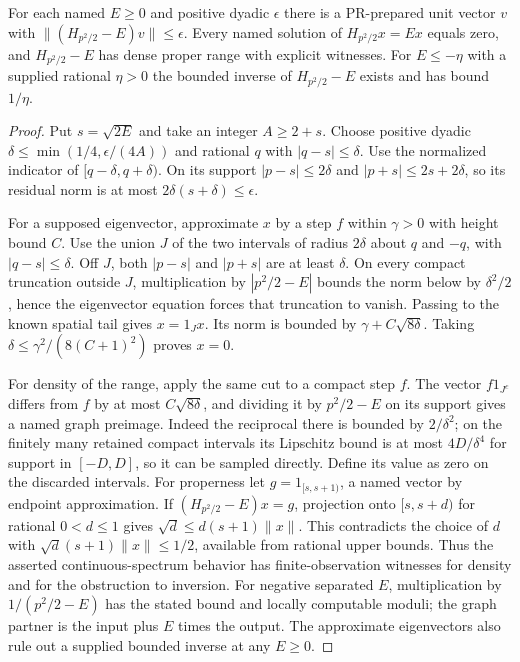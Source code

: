 \begin{proposition}
For each named $E\ge0$ and positive dyadic $\epsilon$ there is a
PR-prepared unit vector $v$ with $\|(H_{p^2/2}-E)v\|\le\epsilon$.
Every named solution of $H_{p^2/2}x=Ex$ equals zero, and
$H_{p^2/2}-E$ has dense proper range with explicit witnesses.
For $E\le-\eta$ with a supplied rational $\eta>0$ the bounded inverse
of $H_{p^2/2}-E$ exists and has bound $1/\eta$.
\end{proposition}
\begin{proof}
Put $s=\sqrt{2E}$ and take an integer $A\ge 2+s$.
Choose positive dyadic $\delta\le\min(1/4,\epsilon/(4A))$ and rational
$q$ with $|q-s|\le\delta$. Use the normalized indicator of
$[q-\delta,q+\delta)$. On its support $|p-s|\le2\delta$ and
$|p+s|\le2s+2\delta$, so its residual norm is at most
$2\delta(s+\delta)\le\epsilon$.

For a supposed eigenvector, approximate $x$ by a step $f$ within
$\gamma>0$ with height bound $C$. Use the union $J$ of the two intervals
of radius $2\delta$ about $q$ and $-q$, with $|q-s|\le\delta$.
Off $J$, both $|p-s|$ and $|p+s|$ are at least $\delta$.
On every compact truncation outside $J$, multiplication by
$|p^2/2-E|$ bounds the norm below by $\delta^2/2$, hence
the eigenvector equation forces that truncation to vanish. Passing
to the known spatial tail gives $x=1_Jx$. Its norm is bounded
by $\gamma+C\sqrt{8\delta}$. Taking
$\delta\le\gamma^2/(8(C+1)^2)$ proves $x=0$.

For density of the range, apply the same cut to a compact step $f$.
The vector $f1_{J^c}$ differs from $f$ by at most $C\sqrt{8\delta}$,
and dividing it by $p^2/2-E$ on its support gives a named graph
preimage. Indeed the reciprocal there is bounded by $2/\delta^2$;
on the finitely many retained compact intervals its Lipschitz bound
is at most $4D/\delta^4$ for support in $[-D,D]$, so it can be
sampled directly. Define its value as zero on the discarded intervals.
For properness let $g=1_{[s,s+1)}$, a named vector by endpoint
approximation. If $(H_{p^2/2}-E)x=g$, projection onto $[s,s+d)$
for rational $0<d\le1$ gives
$\sqrt d\le d(s+1)\|x\|$. This contradicts the choice of
$d$ with $\sqrt d(s+1)\|x\|\le1/2$, available from rational
upper bounds. Thus the asserted continuous-spectrum behavior has
finite-observation witnesses for density and for the obstruction to inversion.
For negative separated $E$, multiplication by $1/(p^2/2-E)$
has the stated bound and locally computable moduli; the graph partner
is the input plus $E$ times the output. The approximate eigenvectors
also rule out a supplied bounded inverse at any $E\ge0$.
\end{proof}

